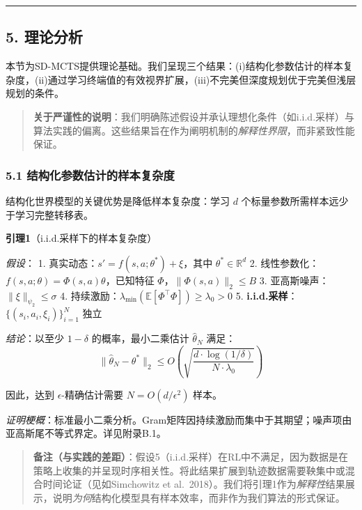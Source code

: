 \documentclass[UTF8]{ctexart}
\begin{document}
\begin{center}\rule{0.5\linewidth}{0.4pt}\end{center}

\hypertarget{ux7406ux8bbaux5206ux6790}{%
\subsection{5. 理论分析}\label{ux7406ux8bbaux5206ux6790}}

本节为SD-MCTS提供理论基础。我们呈现三个结果：(i)结构化参数估计的样本复杂度，(ii)通过学习终端值的有效视界扩展，(iii)不完美但深度规划优于完美但浅层规划的条件。

\begin{quote}
\textbf{关于严谨性的说明}：我们明确陈述假设并承认理想化条件（如i.i.d.采样）与算法实践的偏离。这些结果旨在作为阐明机制的\emph{解释性界限}，而非紧致性能保证。
\end{quote}

\hypertarget{ux7ed3ux6784ux5316ux53c2ux6570ux4f30ux8ba1ux7684ux6837ux672cux590dux6742ux5ea6}{%
\subsubsection{5.1
结构化参数估计的样本复杂度}\label{ux7ed3ux6784ux5316ux53c2ux6570ux4f30ux8ba1ux7684ux6837ux672cux590dux6742ux5ea6}}

结构化世界模型的关键优势是降低样本复杂度：学习 \(d\)
个标量参数所需样本远少于学习完整转移表。

\textbf{引理1}（i.i.d.采样下的样本复杂度）

\emph{假设}： 1. 真实动态：\(s' = f(s,a;\theta^*) + \xi\)，其中
\(\theta^* \in \mathbb{R}^d\) 2.
线性参数化：\(f(s,a;\theta) = \Phi(s,a)\theta\)，已知特征
\(\Phi\)，\(\|\Phi(s,a)\|_2 \leq B\) 3.
亚高斯噪声：\(\|\xi\|_{\psi_2} \leq \sigma\) 4.
持续激励：\(\lambda_{\min}(\mathbb{E}[\Phi^\top \Phi]) \geq \lambda_0 > 0\)
5. \textbf{i.i.d.采样}：\(\{(s_i, a_i, \xi_i)\}_{i=1}^N\) 独立

\emph{结论}：以至少 \(1-\delta\) 的概率，最小二乘估计 \(\hat{\theta}_N\)
满足：
\[\|\hat{\theta}_N - \theta^*\|_2 \leq O\left(\sqrt{\frac{d \cdot \log(1/\delta)}{N \cdot \lambda_0}}\right)\]

因此，达到 \(\epsilon\)-精确估计需要 \(N = O(d/\epsilon^2)\) 样本。

\emph{证明梗概}：标准最小二乘分析。Gram矩阵因持续激励而集中于其期望；噪声项由亚高斯尾不等式界定。详见附录B.1。

\begin{quote}
\textbf{备注（与实践的差距）}：假设5（i.i.d.采样）在RL中不满足，因为数据是在策略上收集的并呈现时序相关性。将此结果扩展到轨迹数据需要鞅集中或混合时间论证（见如Simchowitz
et
al.~2018）。我们将引理1作为\emph{解释性}结果展示，说明\emph{为何}结构化模型具有样本效率，而非作为我们算法的形式保证。
\end{quote}
\end{document}
